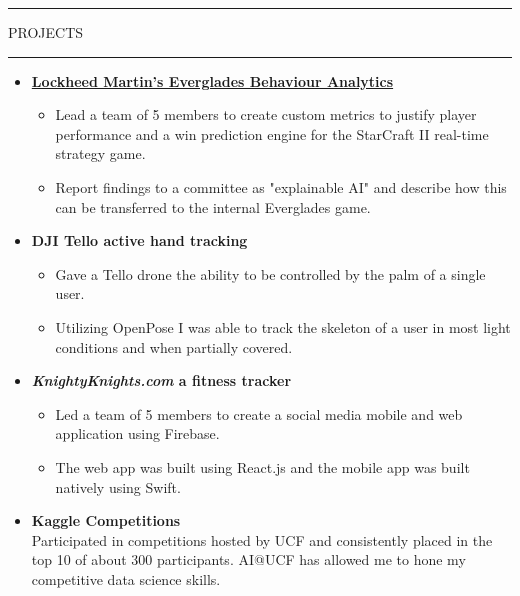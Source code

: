 \documentclass{article}
\newcommand{\makesection}[1]{\hrule\vskip1mm\uppercase{#1}\vskip1mm\hrule}
\begin{document}
\makesection{Projects}
\begin{itemize}[leftmargin=.35cm]
    \item \textbf{\href{https://github.com/ucfcs/Fall2020-Group-20}{Lockheed Martin's Everglades Behaviour Analytics}}
    \raggedright
    \begin{itemize}[leftmargin=.35cm]
        \item Lead a team of 5 members to create custom metrics to justify player performance and a win prediction engine for the StarCraft II real-time strategy game.
        \item Report findings to a committee as "explainable AI" and describe how this can be transferred to the internal Everglades game.
    \end{itemize}

    \item \textbf{DJI Tello active hand tracking} \\
    \raggedright
    \begin{itemize}[leftmargin=.35cm]
        \item Gave a Tello drone the ability to be controlled by the palm of a single user.
        \item Utilizing OpenPose I was able to track the skeleton of a user in most light conditions and when partially covered.
    \end{itemize}

    \item \textbf{\textit{KnightyKnights.com} a fitness tracker} \\
    \raggedright
    \begin{itemize}[leftmargin=.35cm]
        \item Led a team of 5 members to create a social media mobile and web application using Firebase.
        \item The web app was built using React.js and the mobile app was built natively using Swift.
    \end{itemize}

    \item \textbf{Kaggle Competitions} \\
    Participated in competitions hosted by UCF and consistently placed in the top 10 of about 300 participants. AI@UCF has allowed me to hone my competitive data science skills.
\end{itemize}
\end{document}
